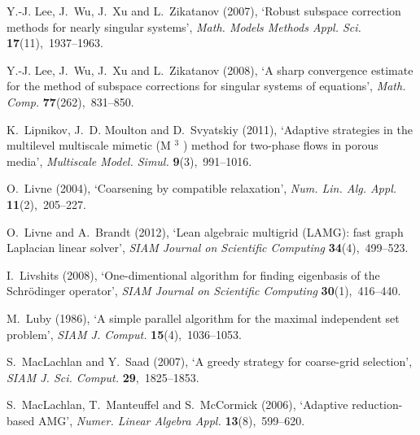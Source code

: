 \documentclass[12pt]{acta_2011xz}
\begin{document}
\begin{thebibliography}{xx}
Y.-J. Lee, J.~Wu, J.~Xu and L.~Zikatanov  (2007), `Robust subspace correction
  methods for nearly singular systems', {\em Math. Models Methods Appl. Sci.}
  {\bf 17}(11),~1937--1963.

Y.-J. Lee, J.~Wu, J.~Xu and L.~Zikatanov  (2008), `A sharp convergence estimate
  for the method of subspace corrections for singular systems of equations',
  {\em Math. Comp.} {\bf 77}(262),~831--850.

K.~Lipnikov, J.~D. Moulton and D.~Svyatskiy  (2011), `Adaptive strategies in
  the multilevel multiscale mimetic ({M{        $^3$        }}) method for two-phase flows in
  porous media', {\em Multiscale Model. Simul.} {\bf 9}(3),~991--1016.

O.~Livne  (2004), `Coarsening by compatible relaxation', {\em Num. Lin. Alg.
  Appl.} {\bf 11}(2),~205--227.

O.~Livne and A.~Brandt  (2012), `Lean algebraic multigrid {(LAMG)}: fast graph
  {L}aplacian linear solver', {\em SIAM Journal on Scientific Computing} {\bf
  34}(4),~499--523.

I.~Livshits  (2008), `{One-dimentional algorithm for finding eigenbasis of the
  Schr\"{o}dinger operator}', {\em SIAM Journal on Scientific Computing} {\bf
  30}(1),~416--440.

M.~Luby  (1986), `A simple parallel algorithm for the maximal independent set
  problem', {\em SIAM J. Comput.} {\bf 15}(4),~1036--1053.

S.~{MacLachlan} and Y.~Saad  (2007), `A greedy strategy for coarse-grid
  selection', {\em SIAM J. Sci. Comput.} {\bf 29},~1825--1853.

S.~MacLachlan, T.~Manteuffel and S.~McCormick  (2006), `Adaptive
  reduction-based {AMG}', {\em Numer. Linear Algebra Appl.} {\bf
  13}(8),~599--620.


\end{thebibliography}
\end{document}
